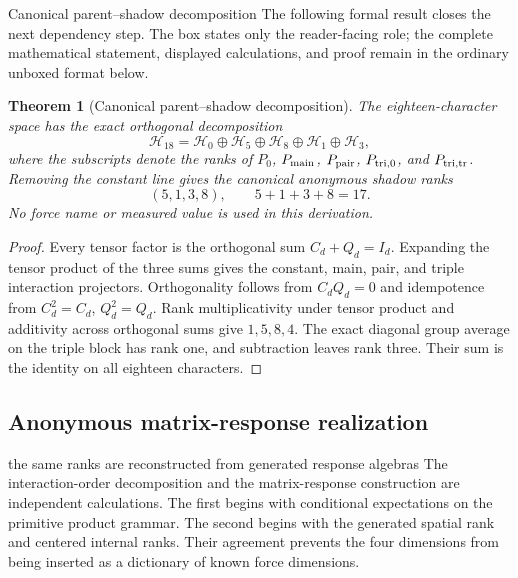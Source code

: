 \documentclass[11pt]{article}
\numberwithin{equation}{section}
\newtheorem{theorem}[definition]{Theorem}
\theoremstyle{remark}
\begin{document}
\begin{proofguide}{Canonical parent--shadow decomposition}
The following formal result closes the next dependency step. The box states only the reader-facing role; the complete mathematical statement, displayed calculations, and proof remain in the ordinary unboxed format below.
\end{proofguide}
\begin{theorem}[Canonical parent--shadow decomposition]
The eighteen-character space has the exact orthogonal decomposition
\begin{equation}
\mathcal H_{18}
=\mathcal H_0\oplus\mathcal H_{5}\oplus\mathcal H_{8}\oplus\mathcal H_{1}\oplus\mathcal H_{3},
\end{equation}
where the subscripts denote the ranks of $P_0$, $P_{\rm main}$, $P_{\rm pair}$, $P_{\rm tri,0}$, and $P_{\rm tri,tr}$. Removing the constant line gives the canonical anonymous shadow ranks
\begin{equation}
(5,1,3,8),
\qquad
5+1+3+8=17.
\label{eq:canonical-shadow-ranks}
\end{equation}
No force name or measured value is used in this derivation.
\end{theorem}
\begin{proof}
Every tensor factor is the orthogonal sum $C_d+Q_d=I_d$. Expanding the tensor product of the three sums gives the constant, main, pair, and triple interaction projectors. Orthogonality follows from $C_dQ_d=0$ and idempotence from $C_d^2=C_d$, $Q_d^2=Q_d$. Rank multiplicativity under tensor product and additivity across orthogonal sums give $1,5,8,4$. The exact diagonal group average on the triple block has rank one, and subtraction leaves rank three. Their sum is the identity on all eighteen characters.
\end{proof}

\subsection{Anonymous matrix-response realization}
\begin{interpretivebridge}{the same ranks are reconstructed from generated response algebras}
The interaction-order decomposition and the matrix-response construction are independent calculations. The first begins with conditional expectations on the primitive product grammar. The second begins with the generated spatial rank and centered internal ranks. Their agreement prevents the four dimensions from being inserted as a dictionary of known force dimensions.
\end{interpretivebridge}
\end{document}
